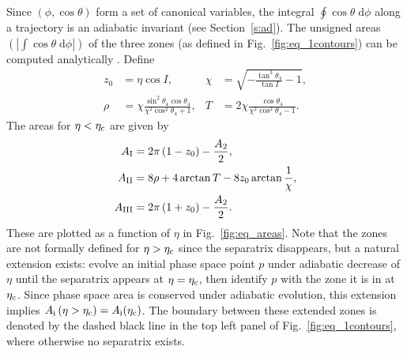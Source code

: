 \documentclass[
        fleqn,
        usenatbib,
    ]{mnras}
\newcommand*{\abs}[1]{\left|#1\right|}
\newcommand*{\p}[1]{\left(#1\right)}
\begin{document}
Since $\p{\phi, \cos \theta}$ form a set of canonical variables, the integral
$\oint \cos \theta\;\mathrm{d}\phi$ along a trajectory is an adiabatic invariant
(see Section~\ref{s:ad}). The unsigned areas $\p{\abs{\int \cos \theta
\;\mathrm{d}\phi}}$ of the three zones (as defined in
Fig.~\ref{fig:eq_1contours}) can be computed analytically
\citep{henrard1987,ward2004I}. Define
\begin{subequations}
    \begin{align}
        z_0 &= \eta\cos I, &
        \chi &= \sqrt{-\frac{\tan^3\theta_4}{\tan I} - 1},\\
        \rho &= \chi \frac{\sin^2 \theta_4\cos \theta_4}{
            \chi^2 \cos^2\theta_4 + 1},&
        T &= 2\chi \frac{\cos \theta_4}{
            \chi^2 \cos^2\theta_4 - 1}.
    \end{align}
\end{subequations}
The areas for $\eta < \eta_{\rm c}$ are given by
\begin{subequations}\label{se:area_ward}
    \begin{align}
        A_{\rm I} &= 2\pi\p{1 - z_0} - \frac{A_2}{2}, \label{eq:A1}\\
        A_{\rm II} &= 8\rho + 4\arctan T - 8z_0 \arctan \frac{1}{\chi},
            \label{eq:A2}\\
        A_{\rm III} &= 2\pi\p{1 + z_0} - \frac{A_2}{2}\label{eq:A3}.
    \end{align}
\end{subequations}
These are plotted as a function of $\eta$ in Fig.~\ref{fig:eq_areas}. Note that
the zones are not formally defined for $\eta > \eta_{\rm c}$ since the
separatrix disappears, but a natural extension exists: evolve an initial phase
space point $p$ under adiabatic decrease of $\eta$ until the separatrix appears
at $\eta = \eta_{\rm c}$, then identify $p$ with the zone it is in at $\eta_{\rm
c}$. Since phase space area is conserved under adiabatic evolution, this
extension implies $A_{\rm i}\p{\eta > \eta_{\rm c}} = A_{\rm i}(\eta_{\rm c})$.
The boundary between these extended zones is denoted by the dashed black line in
the top left panel of Fig.~\ref{fig:eq_1contours}, where otherwise no separatrix
exists.
\end{document}
